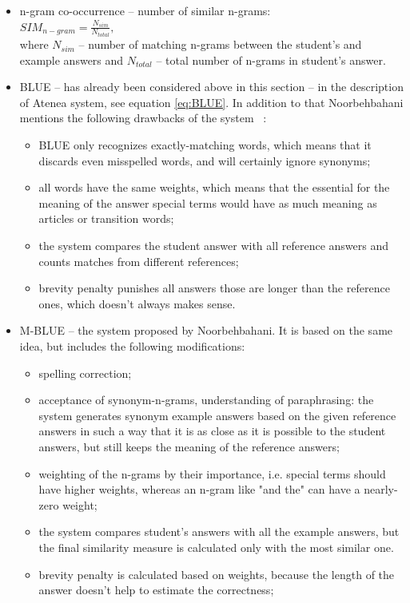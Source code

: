 \begin{itemize}
\item n-gram co-occurrence --  number of similar n-grams:\\
$SIM_{n-gram} = \frac{N_{sim}}{N_{total}},$\\
where $N_{sim}$ -- number of matching n-grams between the student's and example answers and $N_{total}$ -- total number of n-grams in student's answer.
\item BLUE -- has already been considered above in this section -- in the description of Atenea system, see equation \ref{eq:BLUE}. In addition to that
Noorbehbahani mentions the following drawbacks of the system ~\cite{Noorbehbahani}:
\begin{itemize}
\item BLUE only recognizes exactly-matching words, which means that it discards even misspelled words, and will certainly ignore synonyms;
\item all words have the same weights, which means that the essential for the meaning of the answer special terms would have as much meaning as articles or transition words;
\item the system compares the student answer with all reference answers and counts matches from different references;
\item brevity penalty punishes all answers those are longer than the reference ones, which doesn't always makes sense.
\end{itemize}
\item M-BLUE -- the system proposed by Noorbehbahani. It is based on the same idea, but includes the following modifications:
\begin{itemize}
\item spelling correction;
\item acceptance of synonym-n-grams, understanding of paraphrasing: the system generates synonym example answers based on the given reference answers in such a way that it is as close as it is possible to the student answers, but still keeps the meaning of the reference answers;
\item weighting of the n-grams by their importance, i.e. special terms should have higher weights, whereas an n-gram like "and the" can have a nearly-zero weight;
\item the system compares student's answers with all the example answers, but the final similarity measure is calculated only with the most similar one.
\item brevity penalty is calculated based on weights, because the length of the answer doesn't help to estimate the correctness;

\end{itemize}
\end{itemize}
